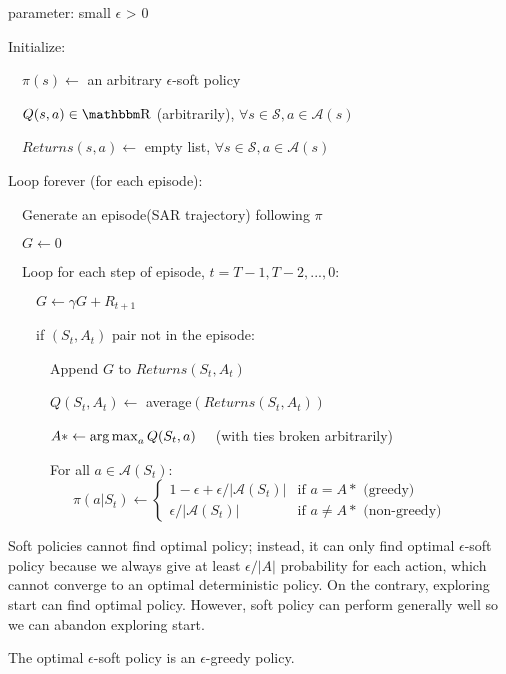 \documentclass[sutton_barto_notes.tex]{subfiles}
\begin{document}
\begin{tcolorbox}[width=1.1\textwidth,title={On-policy first-visit MC control, estimates $V \approx v_\pi$}]
parameter: small $\epsilon$ > 0

Initialize:

$\quad \pi(s) \leftarrow$ an arbitrary $\epsilon$-soft policy

$\quad Q(s,a) \in \R$ (arbitrarily), $\forall s \in \mathcal{S}, a \in \mathcal{A}(s)$

$\quad Returns(s,a) \leftarrow$ empty list, $\forall s \in \mathcal{S}, a \in \mathcal{A}(s)$

Loop forever (for each episode):

$\quad$Generate an episode(SAR trajectory) following $\pi$

$\quad G \leftarrow 0$

$\quad$Loop for each step of episode, $t = T-1, T-2, ..., 0$:

$\quad\quad G\leftarrow \gamma G + R_{t+1}$

$\quad\quad$if $(S_t, A_t)$ pair not in the episode:

$\quad\quad\quad$Append $G$ to $Returns(S_t, A_t)$

$\quad\quad\quad Q(S_t, A_t) \leftarrow$ average$(Returns(S_t, A_t))$

$\quad\quad\quad A* \leftarrow \operatorname*{arg\,max}_a Q(S_t, a) \quad$ (with ties broken arbitrarily)

$\quad\quad\quad$For all $a \in \mathcal{A}(S_t):$
$\quad\quad\quad\quad$ \begin{equation}
  \pi(a|S_t) \leftarrow
    \begin{cases}
      1 - \epsilon + \epsilon / |\mathcal{A}(S_t)| & \text{if $a = A*$ (greedy)}\\
      \epsilon / |\mathcal{A}(S_t)| & \text{if $a \neq A*$ (non-greedy)}
    \end{cases}       
\end{equation}
\end{tcolorbox}

Soft policies cannot find optimal policy; instead, it can only find optimal $\epsilon$-soft policy because we always give at least $\epsilon / |A|$ probability for each action, which cannot converge to an optimal deterministic policy. On the contrary, exploring start can find optimal policy. However, soft policy can perform generally well so we can abandon exploring start.

The optimal $\epsilon$-soft policy is an $\epsilon$-greedy policy.
\end{document}
